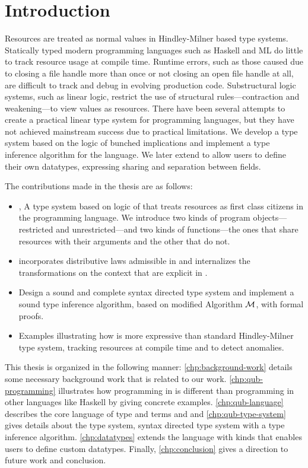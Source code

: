 \chapter{Introduction}\label{chp:intro}

Resources are treated as normal values in Hindley-Milner based type systems. Statically typed modern programming languages such as
Haskell and ML  do little to track resource usage at compile time. Runtime errors, such as those caused due to closing a file handle
more than once or not closing an open file handle at all, are difficult to track and debug in evolving production code.
Substructural logic systems, such as linear logic, restrict the use of structural rules---contraction and weakening---to view values as resources.
There have been several attempts to create a practical linear type system for programming languages, but they have not achieved mainstream
success due to practical limitations. We develop a type system based on the logic of bunched implications
and implement a type inference algorithm for the language. We later extend to allow users to define
their own datatypes, expressing sharing and separation between fields.

The contributions made in the thesis are as follows:
\begin{itemize}
\item \qub{}, A type system based on logic of \BI{} that treats resources as first class citizens in the programming language.
  We introduce two kinds of program objects---restricted and unrestricted---and two kinds of functions---the ones that share resources with
  their arguments and the other that do not.
\item \qub{} incorporates distributive laws admissible in \BI{} and internalizes the transformations on the context that are explicit in \BI{}.
\item Design a sound and complete syntax directed type system and implement a sound type inference algorithm, based on modified Algorithm $\mathcal{M}$, with
  formal proofs.
\item Examples illustrating how \qub{} is more expressive than standard Hindley-Milner type system, tracking resources at compile time and to detect anomalies.
\end{itemize}

This thesis is organized in the following manner: \cref{chp:background-work} details some necessary background work that is related to our work.
\cref{chp:qub-programming} illustrates how programming in \qub{} is different than programming in other languages like Haskell by giving concrete examples.
\cref{chp:qub-language} describes the core language of type and terms and and \cref{chp:qub-type-system} gives details about the type system,
syntax directed type system with a type inference algorithm. \cref{chp:datatypes} extends the language with kinds that enables users to define
custom datatypes. Finally, \cref{chp:conclusion} gives a direction to future work and conclusion.
